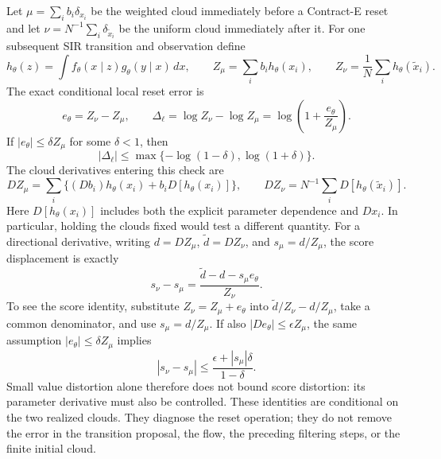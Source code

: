 Let $\mu=\sum_i b_i\delta_{x_i}$ be the weighted cloud immediately before a
Contract-E reset and let
$\nu=N^{-1}\sum_i\delta_{\widetilde x_i}$ be the uniform cloud immediately
after it.  For one subsequent SIR transition and observation define
\[
 h_\theta(z)=\int f_\theta(x\mid z)g_\theta(y\mid x)\,dx,\qquad
 Z_\mu=\sum_i b_i h_\theta(x_i),\qquad
 Z_\nu=\frac{1}{N}\sum_i h_\theta(\widetilde x_i).
\]
The exact conditional local reset error is
\begin{equation}
 e_\theta=Z_\nu-Z_\mu,\qquad
 \Delta_\ell=\log Z_\nu-\log Z_\mu
 =\log\!\left(1+\frac{e_\theta}{Z_\mu}\right).
 \label{eq:bf-hd-conditional-reset-error}
\end{equation}
If $|e_\theta|\leq\delta Z_\mu$ for some $\delta<1$, then
\[
 |\Delta_\ell|\leq
 \max\{-\log(1-\delta),\log(1+\delta)\}.
\]
The cloud derivatives entering this check are
\[
 D Z_\mu=\sum_i\{(D b_i)h_\theta(x_i)
            +b_i D[h_\theta(x_i)]\},\qquad
 D Z_\nu=N^{-1}\sum_i D[h_\theta(\widetilde x_i)].
\]
Here $D[h_\theta(x_i)]$ includes both the explicit parameter dependence and
$D x_i$. In particular, holding the clouds fixed would test a different
quantity. For a directional derivative, writing $d=D Z_\mu$, $\widetilde d=D Z_\nu$,
and $s_\mu=d/Z_\mu$, the score displacement is exactly
\begin{equation}
 s_\nu-s_\mu
 =\frac{\widetilde d-d-s_\mu e_\theta}{Z_\nu}.
 \label{eq:bf-hd-conditional-reset-score}
\end{equation}
To see the score identity, substitute $Z_\nu=Z_\mu+e_\theta$ into
$\widetilde d/Z_\nu-d/Z_\mu$, take a common denominator, and use
$s_\mu=d/Z_\mu$. If also $|D e_\theta|\leq\epsilon Z_\mu$, the same
assumption $|e_\theta|\leq\delta Z_\mu$ implies
\[
 |s_\nu-s_\mu|\leq\frac{\epsilon+|s_\mu|\delta}{1-\delta}.
\]
Small value distortion alone therefore does not bound score distortion:
its parameter derivative must also be controlled.
These identities are conditional on the two realized clouds.  They diagnose
the reset operation; they do not remove the error in the transition proposal,
the flow, the preceding filtering steps, or the finite initial cloud.

